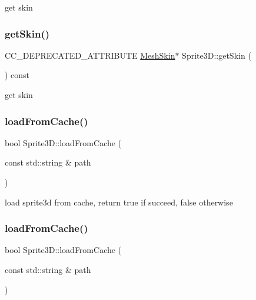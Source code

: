 get skin \mbox{\label{classSprite3D_a3dc3117e72c4bcd841e7fd4ee56f2b98}} 
\subsubsection{\texorpdfstring{get\+Skin()}{getSkin()}\hspace{0.1cm}{\footnotesize\ttfamily [2/2]}}
{\footnotesize\ttfamily C\+C\+\_\+\+D\+E\+P\+R\+E\+C\+A\+T\+E\+D\+\_\+\+A\+T\+T\+R\+I\+B\+U\+TE \hyperlink{classMeshSkin}{Mesh\+Skin}$\ast$ Sprite3\+D\+::get\+Skin (\begin{DoxyParamCaption}{ }\end{DoxyParamCaption}) const}

get skin \mbox{\label{classSprite3D_aeeec351e43e4ccc2d1782bb7652db960}} 
\subsubsection{\texorpdfstring{load\+From\+Cache()}{loadFromCache()}\hspace{0.1cm}{\footnotesize\ttfamily [1/2]}}
{\footnotesize\ttfamily bool Sprite3\+D\+::load\+From\+Cache (\begin{DoxyParamCaption}\item[{const std\+::string \&}]{path }\end{DoxyParamCaption})}

load sprite3d from cache, return true if succeed, false otherwise \mbox{\label{classSprite3D_aeeec351e43e4ccc2d1782bb7652db960}} 
\subsubsection{\texorpdfstring{load\+From\+Cache()}{loadFromCache()}\hspace{0.1cm}{\footnotesize\ttfamily [2/2]}}
{\footnotesize\ttfamily bool Sprite3\+D\+::load\+From\+Cache (\begin{DoxyParamCaption}\item[{const std\+::string \&}]{path }\end{DoxyParamCaption})}

